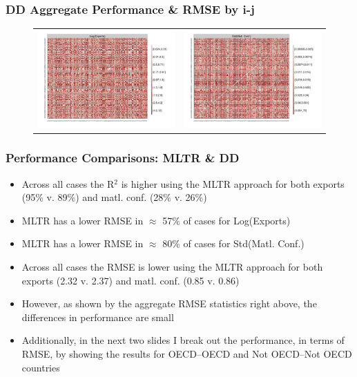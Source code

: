 \documentclass[10pt, compress]{beamer}
\begin{document}
\frame
{
\frametitle{DD Aggregate Performance \& RMSE by i-j}
  
  \begin{figure}[ht]
  \centering
    \begin{tabular}{cc}
      \hspace*{-.63in}
      \includegraphics[width=.6\textwidth]{dyadexpiperf.pdf} & 
      \includegraphics[width=.6\textwidth]{dyadmconfiperf.pdf}
    \end{tabular}
  \end{figure}
}

\frame
{
  \frametitle{Performance Comparisons: MLTR \& DD}

\begin{itemize}
\item Across all cases the R$^{2}$ is higher using the MLTR approach for both exports (95\% v. 89\%) and matl. conf. (28\% v. 26\%)
\item MLTR has a lower RMSE in $\approx$ 57\% of cases for Log(Exports)
\item MLTR has a lower RMSE in $\approx$ 80\% of cases for Std(Matl. Conf.)
\item Across all cases the RMSE is lower using the MLTR approach for both exports (2.32 v. 2.37) and matl. conf. (0.85 v. 0.86)
\item However, as shown by the aggregate RMSE statistics right above, the differences in performance are small
\item Additionally, in the next two slides I break out the performance, in terms of RMSE, by showing the results for OECD--OECD and Not OECD--Not OECD countries
\end{itemize}

}
\end{document}
